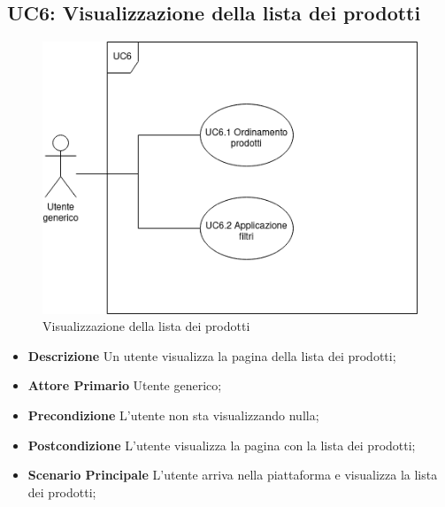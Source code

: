         \subsection{UC6: Visualizzazione della lista dei prodotti}
        \label{sec:UC6}
        \begin{figure}[!ht]
            \caption{Visualizzazione della lista dei prodotti}
            \vspace{10px}
            \includegraphics[scale=0.5]{../../../Images/AnalisiRequisiti/UC6.png}
            \centering
        \end{figure}
        \begin{itemize}
            \item \textbf{Descrizione} Un utente visualizza la pagina della lista dei prodotti;
            \item \textbf{Attore Primario} Utente generico;
            \item \textbf{Precondizione} L'utente non sta visualizzando nulla;
            \item \textbf{Postcondizione} L'utente visualizza la pagina con la lista dei prodotti;
            \item \textbf{Scenario Principale} L'utente arriva nella piattaforma e visualizza la lista dei prodotti;
        \end{itemize}
